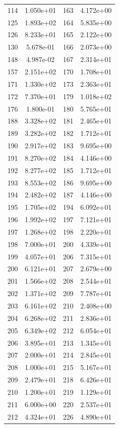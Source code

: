 \documentclass[12pt]{article}
\begin{document}
\begin{longtable}{@{}cccc@{}}
114 & 1.050e+01 & 163 & 4.172e+00 \\
125 & 1.893e+02 & 164 & 5.835e+00 \\
126 & 8.233e+01 & 165 & 2.122e+00 \\
130 & 5.678e-01 & 166 & 2.073e+00 \\
148 & 4.987e-02 & 167 & 2.314e+01 \\
157 & 2.151e+02 & 170 & 1.708e+01 \\
171 & 1.330e+02 & 173 & 2.363e+01 \\
172 & 7.370e+01 & 179 & 1.018e+02 \\
176 & 1.800e-01 & 180 & 5.765e+01 \\
188 & 3.328e+02 & 181 & 2.465e+01 \\
189 & 3.282e+02 & 182 & 1.712e+01 \\
190 & 2.917e+02 & 183 & 9.695e+00 \\
191 & 8.270e+02 & 184 & 4.146e+00 \\
192 & 8.277e+02 & 185 & 1.712e+01 \\
193 & 8.553e+02 & 186 & 9.695e+00 \\
194 & 2.482e+02 & 187 & 4.146e+00 \\
195 & 1.705e+02 & 194 & 6.092e+01 \\
196 & 1.992e+02 & 197 & 7.121e+01 \\
197 & 1.268e+02 & 198 & 2.220e+01 \\
198 & 7.000e+01 & 200 & 4.339e+01 \\
199 & 4.057e+01 & 206 & 7.315e+01 \\
200 & 6.121e+01 & 207 & 2.679e+00 \\
201 & 1.566e+02 & 208 & 2.544e+01 \\
202 & 1.371e+02 & 209 & 7.787e+01 \\
203 & 6.161e+02 & 210 & 2.408e+00 \\
204 & 6.268e+02 & 211 & 2.836e+01 \\
205 & 6.349e+02 & 212 & 6.054e+01 \\
206 & 3.895e+01 & 213 & 1.345e+01 \\
207 & 2.000e+01 & 214 & 2.845e+01 \\
208 & 1.000e+01 & 215 & 5.167e+01 \\
209 & 2.479e+01 & 218 & 6.426e+01 \\
210 & 1.200e+01 & 219 & 1.129e+01 \\
211 & 6.000e+00 & 220 & 2.537e+01 \\
212 & 4.324e+01 & 226 & 4.890e+01 \\

\end{longtable}
\end{document}
